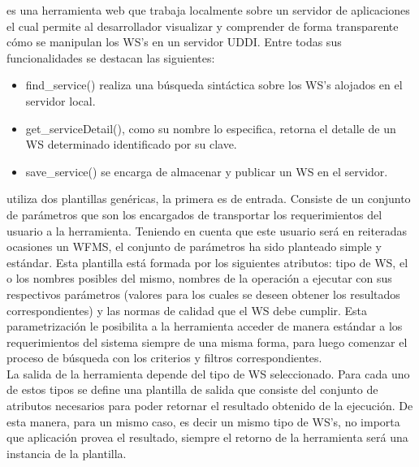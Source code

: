 \cite{JUDDI-Console} es una herramienta web que trabaja localmente sobre un servidor de aplicaciones el cual permite al desarrollador visualizar y comprender de forma transparente cómo se manipulan los WS's en un servidor UDDI. Entre todas sus funcionalidades se destacan las siguientes:
	\begin{itemize}
		\item find\_service()  realiza una búsqueda sintáctica sobre los WS's alojados en el servidor local. 
		
		\item get\_serviceDetail(), como su nombre lo especifica, retorna el detalle de un WS determinado identificado por su clave. 
						
		\item save\_service()  se encarga de almacenar y publicar un WS en el servidor.
		
	\end{itemize}
	
\cite{GG-WSfinder} utiliza dos plantillas genéricas, la primera es de entrada. Consiste de un conjunto de parámetros que son los encargados de transportar los requerimientos del usuario a la herramienta. Teniendo en cuenta que este usuario será en reiteradas ocasiones un WFMS, el conjunto de parámetros ha sido planteado simple y estándar. Esta plantilla está formada por los siguientes atributos: tipo de WS, el o los nombres posibles del mismo, nombres de la operación a ejecutar con sus respectivos parámetros (valores para los cuales se deseen obtener los resultados correspondientes) y las normas de calidad que el WS debe cumplir. Esta parametrización le posibilita a la herramienta acceder de manera estándar a los requerimientos del sistema siempre de una misma forma, para luego comenzar el proceso de búsqueda con los criterios y filtros correspondientes. \\
La salida de la herramienta depende del tipo de WS seleccionado. Para cada uno de estos tipos se define una plantilla de salida que consiste del conjunto de atributos necesarios para poder retornar el resultado obtenido de la ejecución. De esta manera, para un mismo caso, es decir un mismo tipo de WS's, no importa que aplicación provea el resultado, siempre el retorno de la herramienta será una instancia de la plantilla.\\\\


